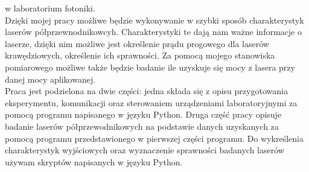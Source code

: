 w laboratorium fotoniki. \\
Dzięki mojej pracy możliwe będzie wykonywanie w szybki sposób charakterystyk laserów półprzewnodnikowcyh.
Charakterystyki te dają nam ważne informacje o laserze, dzięki nim możliwe jest określenie prądu progowego dla laserów krawędziowych,
określenie ich sprawności. Za pomocą mojego stanowiska pomiarowego możliwe także będzie badanie ile uzyskuje się mocy z lasera przy danej mocy aplikowanej. \\
Praca jest podzielona na dwie części: jedna składa się z opisu przygotowania eksperymentu, komunikacji oraz sterowaniem urządzeniami laboratoryjnymi
 za pomocą programu napisanego w języku Python. Druga część pracy opisuje badanie laserów półprzewodnikowych na podstawie danych uzyskanych
 za pomocą programu przedstawionego w pierwszej części programu. Do wykreślenia charakterystyk wyjściowych oraz wyznaczenie sprawności
 badanych laserów używam skryptów napisanych w języku Python.